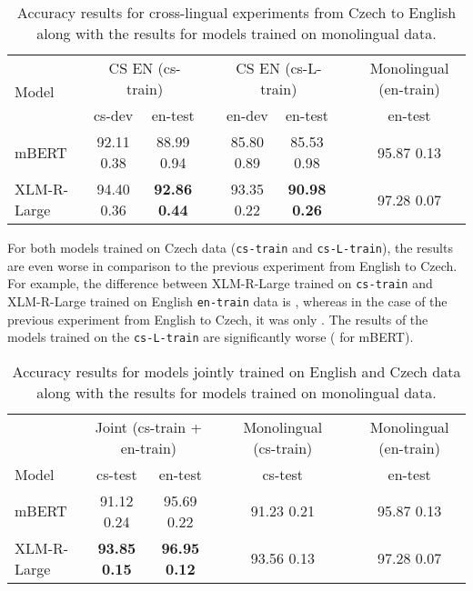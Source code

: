 \documentclass[10pt, a4paper]{article}
\begin{document}
\begin{table*}[h!]
\begin{adjustbox}{width=0.82\linewidth,center}
\begin{tabular}{lccccccc} \toprule
 \multirow{2}{*}{Model}             & \multicolumn{2}{c}{CS  EN (cs-train)} & & \multicolumn{2}{c}{CS  EN (cs-L-train)}  & & \multicolumn{1}{c}{Monolingual (en-train)} \\ \cline{2-3} \cline{5-6} \cline{8-8}
     & cs-dev           & en-test    &      & en-dev           & en-test       &  & en-test         \\ \midrule
mBERT & 92.11  0.38     & 88.99  0.94 &      &        85.80  0.89                   &    85.53  0.98            & &  95.87  0.13  \\
XLM-R-Large & 94.40  0.36     & \textbf{92.86}  \textbf{0.44} & &         93.35  0.22                     &       \textbf{90.98}  \textbf{0.26}           &  &  97.28  0.07  \\ \bottomrule
\end{tabular}
\end{adjustbox}
\caption{Accuracy results for cross-lingual experiments from Czech to English along with the results for models trained on monolingual data.} \label{tab:crosslingual-cs-en}
\end{table*}

\par For both models trained on Czech data (\texttt{cs-train} and \texttt{cs-L-train}), the results are even worse in comparison to the previous experiment from English to Czech. For example, the difference between XLM-R-Large trained on \texttt{cs-train} and XLM-R-Large trained on English \texttt{en-train} data is , whereas in the case of the previous experiment from English to Czech, it was only . The results of the models trained on the \texttt{cs-L-train} are significantly worse ( for mBERT).


\begin{table*}[ht!]
\begin{adjustbox}{width=0.82\linewidth,center}
\begin{tabular}{lcccccc} \toprule
            & \multicolumn{2}{c}{Joint (cs-train + en-train)} && \multicolumn{1}{c}{Monolingual (cs-train)} &&  Monolingual (en-train) \\ \cline{2-3} \cline{5-5} \cline{7-7}
Model       & cs-test        & en-test       && cs-test            && en-test             \\ \midrule
mBERT       & 91.12  0.24   & 95.69  0.22  && 91.23  0.21 && 95.87  0.13 \\
XLM-R-Large & \textbf{93.85}  \textbf{0.15}   & \textbf{96.95}  \textbf{0.12}  && 93.56  0.13 && 97.28  0.07 \\ \bottomrule
\end{tabular}
\end{adjustbox}
\caption{Accuracy results for models jointly trained on English and Czech data along with the results for models trained on monolingual data.} \label{tab:crosslingual-joint}
\end{table*}
\end{document}
